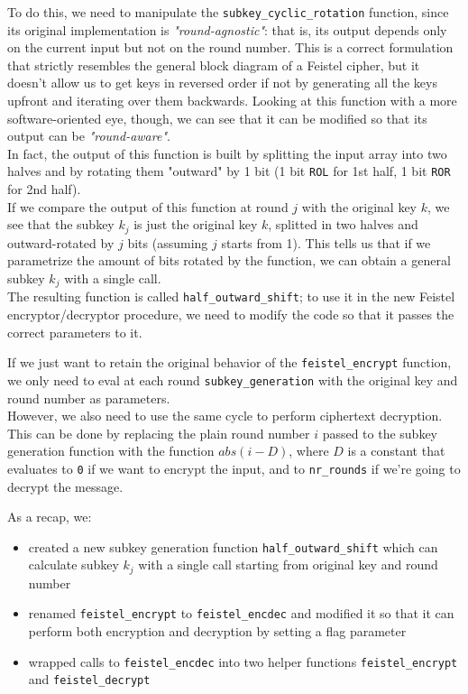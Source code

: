 \documentclass[a4paper,12pt,titlepage]{article}
\begin{document}
To do this, we need to manipulate the \texttt{subkey\_cyclic\_rotation} function, since
its original implementation is \emph{"round-agnostic"}: that is, its output depends
only on the current input but not on the round number. This is a correct
formulation that strictly resembles the general block diagram of a Feistel
cipher, but it doesn't allow us to get keys in reversed order if not by
generating all the keys upfront and iterating over them backwards. Looking at this
function with a more software-oriented eye, though, we can see that it can be
modified so that its output can be \emph{"round-aware"}. \\
In fact, the output of this function is built by splitting the
input array into two halves and by rotating them "outward" by 1 bit (1 bit
\texttt{ROL} for 1st half, 1 bit \texttt{ROR} for 2nd half). \\
If we compare the output of this function at round $j$ with the
original key $k$,
we see that the subkey $k_j$ is just the original key $k$, splitted in two halves
and outward-rotated by $j$ bits (assuming $j$ starts from 1).
This tells us that if we parametrize the amount of bits rotated by the 
function, we can obtain a general subkey $k_j$ with a single call. \\
The resulting function is called \texttt{half\_outward\_shift}; to use it in the
new Feistel encryptor/decryptor procedure, we need to modify the code so that
it passes the correct parameters to it.

If we just want to retain the original behavior of the \texttt{feistel\_encrypt} 
function, we only need to eval at each round \texttt{subkey\_generation} with the
original key and round number as parameters. \\
However, we also need to use the same cycle to perform ciphertext decryption. \\
This can be done by replacing the plain round number $i$ passed to the subkey
generation function with the function $abs(i - D)$, where
$D$ is a constant that
evaluates to \texttt{0} if we want to encrypt the input, and to \texttt{nr\_rounds} if we're
going to decrypt the message.

As a recap, we:

\begin{itemize}
	\item created a new subkey generation function \texttt{half\_outward\_shift} which can
        calculate subkey $k_j$ with a single call starting from original key and round
        number
	\item renamed \texttt{feistel\_encrypt} to \texttt{feistel\_encdec} and modified it so that it can
        perform both encryption and decryption by setting a flag parameter
	\item wrapped calls to \texttt{feistel\_encdec} into two helper functions \texttt{feistel\_encrypt}
	      and \texttt{feistel\_decrypt}
\end{itemize}
\end{document}
